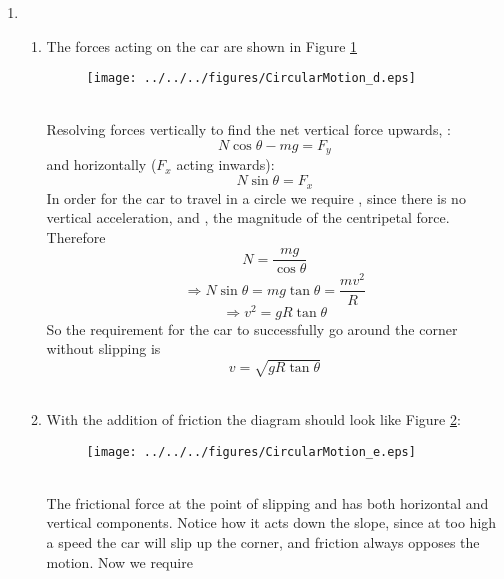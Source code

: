 \begin{problem}
{\begin{enumerate}
\begin{equation*}
\Rightarrow v^2=\mu gR
\end{equation*} therefore
\begin{equation*}
v\le\sqrt{\mu gR}
\end{equation*}
for the car not to slip. 
\\
\item
\begin{enumerate}
\item The forces acting on the car are shown in Figure \ref{fig:CircularMotion_d}
\begin{figure}[h]
\centering
\texttt{[image: ../../../figures/CircularMotion\_d.eps]}
\caption{}
\label{fig:CircularMotion_d}
\end{figure}
\\
Resolving forces vertically to find the net vertical force upwards, :
\begin{equation*} N\cos\theta-mg=F_y \end{equation*}
and horizontally ($F_x$ acting inwards):
\begin{equation*} N\sin\theta=F_x \end{equation*}
In order for the car to travel in a circle we require , since there is no vertical acceleration, and \value{F_x}{mv^2/R}, the magnitude of the centripetal force. Therefore
\begin{equation*} N=\frac{mg}{\cos\theta} \end{equation*}
\begin{equation*} \Rightarrow N\sin\theta=mg\tan\theta=\frac{mv^2}{R} \end{equation*}
\begin{equation*} \Rightarrow v^2=gR\tan\theta \end{equation*}
So the requirement for the car to successfully go around the corner without slipping is 
\begin{equation*}
v=\sqrt{gR\tan\theta}
\end{equation*}
\\
\item With the addition of friction the diagram should look like Figure \ref{fig:CircularMotion_e}:
\begin{figure}[h]
\centering
\texttt{[image: ../../../figures/CircularMotion\_e.eps]}
\caption{}
\label{fig:CircularMotion_e}
\end{figure}
\\
The frictional force  at the point of slipping and has both horizontal and vertical components. Notice how it acts down the slope, since at too high a speed the car will slip up the corner, and friction always opposes the motion. Now we require

\end{enumerate}
\end{enumerate}}
\end{problem}
